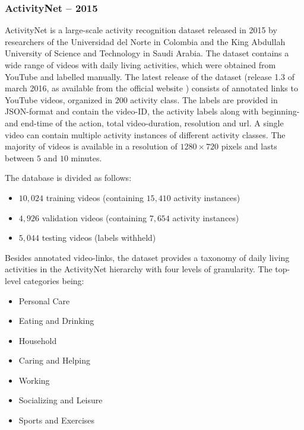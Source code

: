 \subsubsection{ActivityNet -- 2015}
ActivityNet \cite{caba_heilbron_activitynet:_2015} is a large-scale activity recognition dataset released in 2015 by researchers of the Universidad del Norte in Colombia and the King Abdullah University of Science and Technology in Saudi Arabia.
The dataset contains a wide range of videos with daily living activities, which were obtained from YouTube and labelled manually.
The latest release of the dataset (release 1.3 of march 2016, as available from the official website \cite{_activity_????}) consists of annotated links to YouTube videos, organized in $200$ activity class.
The labels are provided in JSON-format and contain the video-ID, the activity labels along with beginning- and end-time of the action, total video-duration, resolution and url.
A single video can contain multiple activity instances of different activity classes.
The majority of videos is available in a resolution of $1280 \times 720$ pixels and lasts between $5$ and $10$ minutes.

The database is divided as follows:
\begin{itemize}
    \item $10,024$ training videos (containing $15,410$ activity instances) 
    \item $4,926$ validation videos (containing $7,654$ activity instances)
    \item $5,044$ testing videos (labels withheld) 
\end{itemize}

Besides annotated video-links, the dataset provides a taxonomy of daily living activities in the ActivityNet hierarchy with four levels of granularity.
The top-level categories being:
\begin{itemize}
    \item Personal Care
    \item Eating and Drinking
    \item Household
    \item Caring and Helping
    \item Working
    \item Socializing and Leisure
    \item Sports and Exercises
\end{itemize}


